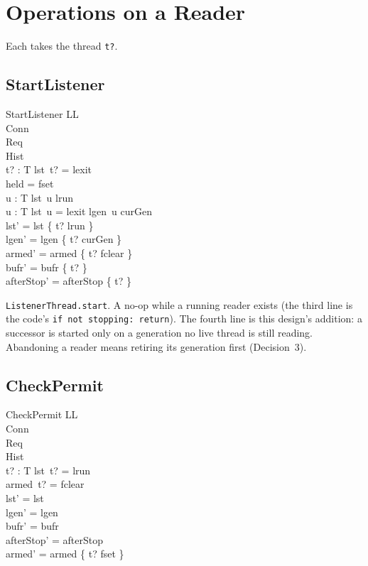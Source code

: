 \documentclass[a4paper,10pt,fleqn]{article}
\begin{document}
\section{Operations on a Reader}

Each takes the thread \texttt{t?}.

\subsection{StartListener}

\begin{schema}{StartListener}
  \Delta LL \\
  \Xi Conn \\
  \Xi Req \\
  \Xi Hist \\
  t? : T
\where
  lst~t? = lexit \\
  held = fset \\
  \forall u : T \spot lst~u \neq lrun \\
  \forall u : T \spot lst~u = lexit \lor lgen~u \neq curGen \\
  lst' = lst \oplus \{ t? \mapsto lrun \} \\
  lgen' = lgen \oplus \{ t? \mapsto curGen \} \\
  armed' = armed \oplus \{ t? \mapsto fclear \} \\
  bufr' = bufr \oplus \{ t? \mapsto \emptyset \} \\
  afterStop' = afterStop \oplus \{ t?  \}
\end{schema}

\texttt{ListenerThread.start}.  A no-op while a running reader exists (the third line is the code's \texttt{if not stopping: return}).  The fourth line is this design's addition: a successor is started only on a generation no live thread is still reading.  Abandoning a reader means retiring its generation first (Decision~3).

\subsection{CheckPermit}

\begin{schema}{CheckPermit}
  \Delta LL \\
  \Xi Conn \\
  \Xi Req \\
  \Xi Hist \\
  t? : T
\where
  lst~t? = lrun \\
  armed~t? = fclear \\
  lst' = lst \\
  lgen' = lgen \\
  bufr' = bufr \\
  afterStop' = afterStop \\
  armed' = armed \oplus \{ t? \mapsto fset \}
\end{schema}
\end{document}
